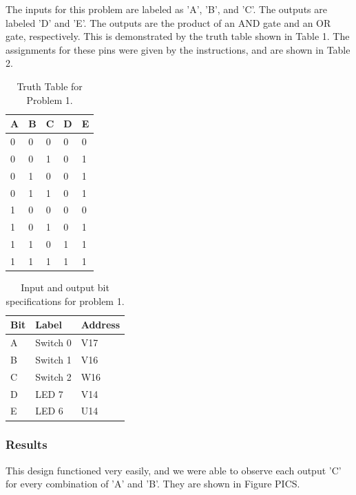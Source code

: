 \documentclass[11pt]{article}
\begin{document}
The inputs for this problem are labeled as 'A', 'B', and 'C'. The outputs are labeled 'D' and 'E'. The outputs are the product of an AND gate and an OR gate, respectively. This is demonstrated by the truth table shown in Table 1. The assignments for these pins were given by the instructions, and are shown in Table 2.

\begin{table}[h]
\begin{center}
	\begin{tabular}{| l | l | l | l | l |}
		\hline
		A & B & C & D & E \\ \hline
		0 & 0 & 0 & 0 & 0 \\ \hline
		0 & 0 & 1 & 0 & 1 \\ \hline
		0 & 1 & 0 & 0 & 1 \\ \hline
		0 & 1 & 1 & 0 & 1 \\ \hline
		1 & 0 & 0 & 0 & 0 \\ \hline
		1 & 0 & 1 & 0 & 1 \\ \hline
		1 & 1 & 0 & 1 & 1 \\ \hline
		1 & 1 & 1 & 1 & 1 \\ \hline
	\end{tabular}
	\caption{\label{tab:table-name}Truth Table for Problem 1.}
\end{center}	
\end{table}

\begin{table}[h]
\begin{center}
	\begin{tabular}{| l | l | l |}
		\hline
		Bit & Label & Address\\ \hline
		A & Switch 0 & V17 \\ \hline
		B & Switch 1 & V16 \\ \hline
		C & Switch 2 & W16 \\ \hline
		D & LED 7 & V14 \\ \hline
		E & LED 6 & U14 \\ \hline
	\end{tabular}
	\caption{\label{tab:table-name}Input and output bit specifications for problem 1.}
\end{center}
\end{table}

\subsubsection{Results}

This design functioned very easily, and we were able to observe each output 'C' for every combination of 'A' and 'B'. They are shown in Figure PICS. 
\end{document}
